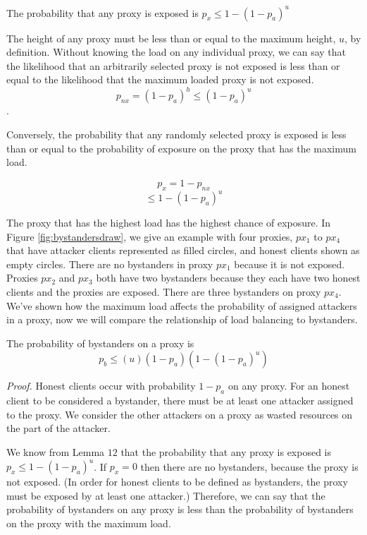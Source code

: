 \begin{lemma}{The probability that any proxy is exposed is $p_x \leq 1 - (1-p_a)^{u}$}

The height of any proxy must be less than or equal to the maximum height, $u$, by definition. Without knowing the load on any individual proxy, we can say that the likelihood that an arbitrarily selected proxy is not exposed is less than or equal to the likelihood that the maximum loaded proxy is not exposed.
$$p_{nx} = (1-p_a)^{h} \leq (1-p_a)^{u}$$.

Conversely, the probability that any randomly selected proxy is exposed is less than or equal to the probability of exposure on the proxy that has the maximum load.

$$p_x = 1 - p_{nx}$$
$$ \leq 1 - (1-p_a)^{u}$$

\end{lemma}

The proxy that has the highest load has the highest chance of exposure. In Figure \ref{fig:bystandersdraw}, we give an example with four proxies, $px_1$ to $px_4$ that have attacker clients represented as filled circles, and honest clients shown as empty circles. There are no bystanders in proxy $px_1$ because it is not exposed. Proxies $px_2$ and $px_3$ both have two bystanders because they each have two honest clients and the proxies are exposed. There are three bystanders on proxy $px_4$. We've shown how the maximum load affects the probability of assigned attackers in a proxy, now we will compare the relationship of load balancing to bystanders. 
 


\begin{theorem}{The probability of bystanders on a proxy is $$p_b \leq (u)(1-p_a)(1-(1-p_a)^{u})$$}
\end{theorem}

\textit{Proof.} Honest clients occur with probability $1-p_a$ on any proxy. For an honest client to be considered a bystander, there must be at least one attacker assigned to the proxy. We consider the other attackers on a proxy as wasted resources on the part of the attacker.

We know from Lemma $12$ that the probability that any proxy is exposed is $p_x \leq 1 - (1-p_a)^{u}$. If $p_x = 0$ then there are no bystanders, because the proxy is not exposed. (In order for honest clients to be defined as bystanders, the proxy must be exposed by at least one attacker.) Therefore, we can say that the probability of bystanders on any proxy is less than the probability of bystanders on the proxy with the maximum load.

